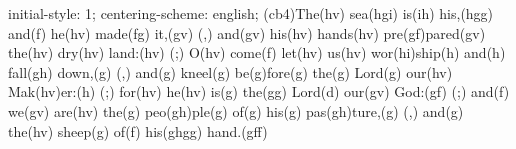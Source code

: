 initial-style: 1;
centering-scheme: english;
(cb4)The(hv) sea(hgi) is(ih) his,(hgg) and(f) he(hv) made(fg) it,(gv) (,) and(gv) his(hv) hands(hv) pre(gf)pared(gv) the(hv) dry(hv) land:(hv) (;) O(hv) come(f) let(hv) us(hv) wor(hi)ship(h) and(h) fall(gh) down,(g) (,) and(g) kneel(g) be(g)fore(g) the(g) Lord(g) our(hv) Mak(hv)er:(h) (;) for(hv) he(hv) is(g) the(gg) Lord(d) our(gv) God:(gf) (;) and(f) we(gv) are(hv) the(g) peo(gh)ple(g) of(g) his(g) pas(gh)ture,(g) (,) and(g) the(hv) sheep(g) of(f) his(ghgg) hand.(gff)
